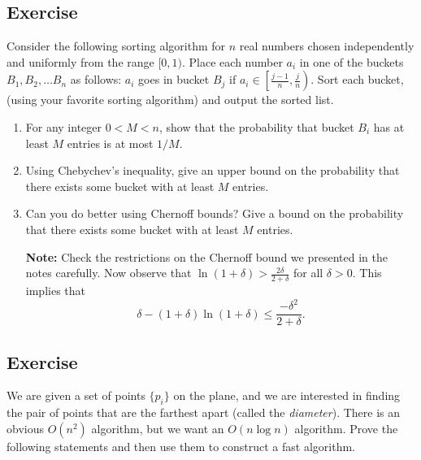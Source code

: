 \documentclass{article}
\newcounter{counter}
\newcommand{\Exercise}{Exercise \stepcounter{counter}\thecounter}
\begin{document}
\subsection*{\Exercise}
    Consider the following sorting algorithm for $n$ real numbers chosen independently and uniformly from the range $[0,1)$. Place each number $a_i$ in one of the buckets $B_1, B_2, \ldots B_n$ as follows: $a_i$ goes in bucket $B_j$ if $a_i \in \left[\frac{j-1}{n},\frac{j}{n}\right)$. Sort each bucket, (using your favorite sorting algorithm) and output the sorted list.
    \begin{enumerate}
        \item For any integer $0 < M < n$, show that the probability that bucket $B_i$ has at least $M$ entries is at most $1/M$.
        \item Using Chebychev's inequality, give an upper bound on the probability that there exists some bucket with at least $M$ entries.
        \item Can you do better using Chernoff bounds? Give a bound on the probability that there exists some bucket with at least $M$ entries.

        \vspace{3mm}
        \textbf{Note:} Check the restrictions on the Chernoff bound we presented in the notes carefully. Now observe that $\ln(1 + \delta) > \frac{2\delta}{2 + \delta} $ for all \underline{$\delta > 0$}. This implies that $$\delta - (1 + \delta) \ln(1 + \delta) \le \frac{-\delta^{2}}{2 + \delta}.$$
    \end{enumerate}

\subsection*{\Exercise}
    We are given a set of points $\{p_i\}$ on the plane, and we are interested in finding the pair of points that are the farthest apart (called the {\em diameter}). There is an obvious $O(n^2)$ algorithm, but we want an $O(n\log n)$ algorithm.  Prove the following statements and then use them to construct a fast algorithm.
\end{document}
